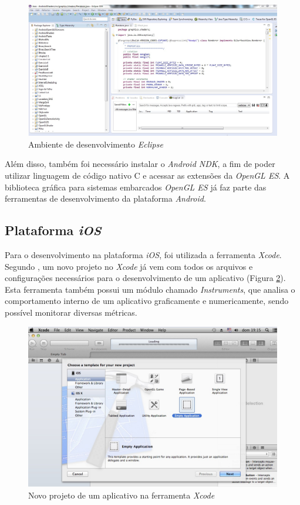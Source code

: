 	\begin{figure}[ht]
	\centering
		\includegraphics[keepaspectratio=true,scale=0.35]{figuras/eclipse.jpg}
	\caption{Ambiente de desenvolvimento \textit{Eclipse}}
	\label{eclipse}
	\end{figure}

	Além disso, também foi necessário instalar o \textit{Android NDK}, a fim de poder utilizar linguagem de código nativo C e acessar as extensões da \textit{OpenGL ES}. A biblioteca gráfica para sistemas embarcados \textit{OpenGL ES} já faz parte das ferramentas de desenvolvimento da plataforma \textit{Android}. 

\subsection{Plataforma \textit{iOS}}

	Para o desenvolvimento na plataforma \textit{iOS}, foi utilizada a ferramenta \textit{Xcode}. Segundo \cite{neub2013}, um novo projeto no \textit{Xcode} já vem com todos os arquivos e configurações necessários para o desenvolvimento de um aplicativo (Figura \ref{xcode}).  Esta ferramenta também possui um módulo chamado \textit{Instruments}, que analisa o comportamento interno de um aplicativo graficamente e numericamente, sendo possível monitorar diversas métricas.  

	\begin{figure}[ht]
	\centering
		\includegraphics[keepaspectratio=true,scale=0.5]{figuras/xcode.jpg}
	\caption{Novo projeto de um aplicativo na ferramenta \textit{Xcode}}
	\label{xcode}
	\end{figure}

